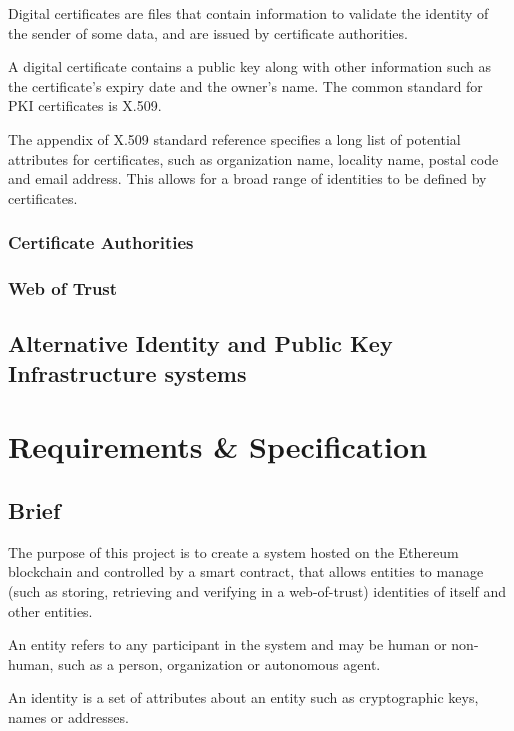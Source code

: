 \documentclass[12pt]{report}
\begin{document}
	Digital certificates are files that contain information to validate the identity of the sender of some data, and are issued by certificate authorities.
	
	A digital certificate contains a public key along with other information such as the certificate's expiry date and the owner's name. The common standard for PKI certificates is X.509.\cite{28}
	
	The appendix of X.509 standard reference specifies a long list of potential attributes for certificates, such as organization name, locality name, postal code and email address. This allows for a broad range of identities to be defined by certificates.
	
	\subsection{Certificate Authorities}
	\subsection{Web of Trust}
	\section{Alternative Identity and Public Key Infrastructure systems}
	
	\chapter{Requirements \& Specification}
	\section{Brief}
	The purpose of this project is to create a system hosted on the Ethereum blockchain and controlled by a smart contract, that allows entities to manage (such as storing, retrieving and verifying in a web-of-trust) identities of itself and other entities.
	
	An entity refers to any participant in the system and may be human or non-human, such as a person, organization or autonomous agent.
	
	An identity is a set of attributes about an entity such as cryptographic keys, names or addresses.
	
\end{document}
